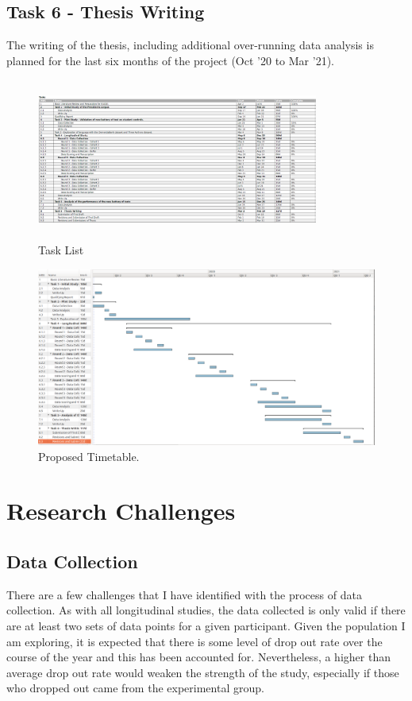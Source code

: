 \documentclass[10pt, letterpaper, twoside, openany]{book}
\begin{document}
\subsection{Task 6 - Thesis Writing}
The writing of the thesis, including additional over-running data analysis is planned for the last six months of the project (Oct '20 to Mar '21).

\begin{figure}[H]
	\centering
	\includegraphics[width=350px, height=200px]{images/TaskList.png}
	\caption{Task List}
\end{figure}

\begin{figure}
	\includegraphics[width=\textwidth]{images/GanttChart.png}
	\caption{Proposed Timetable.}
\end{figure}

\section{Research Challenges}
\subsection{Data Collection}
There are a few challenges that I have identified with the process of data collection. As with all longitudinal studies, the data collected is only valid if there are at least two sets of data points for a given participant. Given the population I am exploring, it is expected that there is some level of drop out rate over the course of the year and this has been accounted for.  Nevertheless, a higher than average drop out rate would weaken the strength of the study, especially if those who dropped out came from the experimental group.
\end{document}
